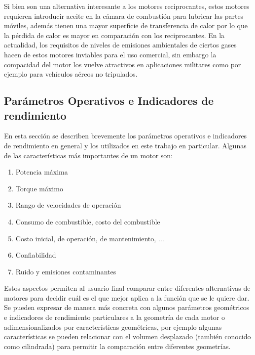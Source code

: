 Si bien son una alternativa interesante a los motores reciprocantes, estos
motores requieren introducir aceite en la cámara de combustión para lubricar
las partes móviles, además tienen una mayor superficie de transferencia de
calor por lo que la pérdida de calor es mayor en comparación con los
reciprocantes.
%
En la actualidad, los requisitos de niveles de emisiones ambientales de ciertos
gases hacen de estos motores inviables para el uso comercial, sin embargo la
compacidad del motor los vuelve atractivos en aplicaciones militares como por
ejemplo para vehículos aéreos no tripulados.


\subsection{Parámetros Operativos e Indicadores de rendimiento}
%
En esta sección se describen brevemente los parámetros operativos e indicadores
de rendimiento en general y los utilizados en este trabajo en particular.
%
Algunas de las características más importantes de un motor son:
%
\begin{enumerate}
    \item Potencia máxima
    \item Torque máximo
    \item Rango de velocidades de operación
    \item Consumo de combustible, costo del combustible
    \item Costo inicial, de operación, de mantenimiento, ...
    \item Confiabilidad
    \item Ruido y emisiones contaminantes
\end{enumerate}

Estos aspectos permiten al usuario final  comparar entre diferentes
alternativas de motores para decidir cuál es el que mejor aplica a la función
que se le quiere dar.
%
Se pueden expresar de manera más concreta con algunos parámetros geométricos e
indicadores de rendimiento particulares a la geometría de cada motor o
adimensionalizados por características geométricas, por ejemplo algunas
características se pueden relacionar con el volumen desplazado (también
conocido como cilindrada) para permitir la comparación entre diferentes
geometrías.


